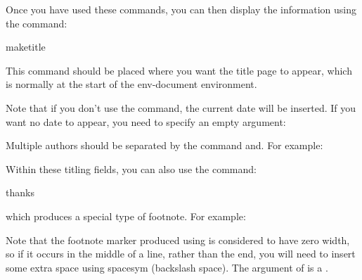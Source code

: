 Once you have used these commands, you can then
display the information using the command:\label{obj:maketitle}
\begin{definition}
\gls{maketitle}
\end{definition}
This command should be placed where you want the title page to
appear, which is normally at the start of the \gls{env-document}
environment.

Note that if you don't use the  command, the current 
date will be inserted.  If you want no date to appear, you need to 
specify an empty argument:
\begin{codeS}
\marg{}
\end{codeS}
\bookpagebreak
Multiple authors should be separated by the command \gls{and}.
For example:
\begin{code}
\begin{alltt}
\end{alltt}
\end{code}%
Within these titling fields, you can also use the command:
\begin{definition}
\gls{thanks}
\end{definition}%
which produces a special type of footnote. For example:
\begin{codeS}
\end{codeS}%
Note that the footnote marker produced using 
is considered to have zero width, so if it occurs in the middle
of a line, rather than the end, you will need to insert some
extra space using \gls{spacesym} (backslash space).
The argument of  is a .

